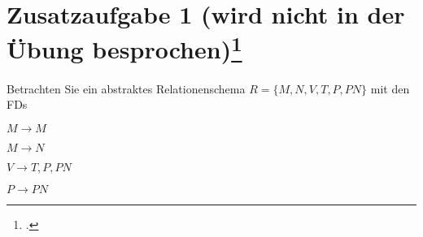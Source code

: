 \documentclass{lehramt-informatik-haupt}
\begin{document}
%

\section{Zusatzaufgabe 1 (wird nicht in der Übung
besprochen)\footcite{db:pdf:tum:uebung-08}}

Betrachten Sie ein abstraktes Relationenschema $R = \{M, N, V, T, P,
PN\}$ mit den FDs

\begin{compactitem}
\item $M \rightarrow M$
\item $M \rightarrow N$
\item $V \rightarrow T, P, PN$
\item $P \rightarrow PN$
\end{compactitem}
\end{document}
